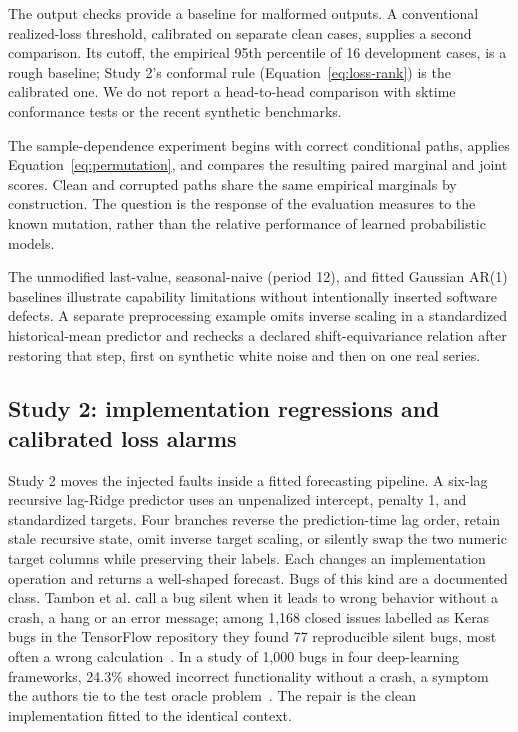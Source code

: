 \documentclass[11pt,a4paper]{article}
\begin{document}
The output checks provide a baseline for malformed outputs. A
conventional realized-loss threshold, calibrated on separate clean cases,
supplies a second comparison. Its cutoff, the empirical 95th percentile of
16 development cases, is a rough baseline; Study 2's conformal rule
(Equation~\eqref{eq:loss-rank}) is the calibrated one. We do not report a head-to-head comparison
with sktime conformance tests or the recent synthetic benchmarks.

The sample-dependence experiment begins with correct conditional paths,
applies Equation~\eqref{eq:permutation}, and compares the resulting
paired marginal and joint scores. Clean and corrupted paths share the
same empirical marginals by construction. The question is the response
of the evaluation measures to the known mutation, rather than the
relative performance of learned probabilistic models.

The unmodified last-value, seasonal-naive (period 12), and fitted Gaussian
AR(1) baselines illustrate capability limitations without intentionally
inserted software defects. A separate preprocessing example omits inverse
scaling in a standardized historical-mean predictor and rechecks a declared
shift-equivariance relation after restoring that step, first on synthetic
white noise and then on one real series.

\subsection{Study 2: implementation regressions and calibrated loss alarms}
\label{sec:implementation-study}

Study 2 moves the injected faults inside a fitted forecasting pipeline. A
six-lag recursive lag-Ridge predictor uses an unpenalized intercept, penalty 1, and standardized targets.
Four branches reverse the prediction-time lag order, retain stale
recursive state, omit inverse target scaling, or silently swap the two
numeric target columns while preserving their labels. Each changes an
implementation operation and returns a well-shaped forecast.
Bugs of this kind are a documented class. Tambon et al. call a bug silent
when it leads to wrong behavior without a crash, a hang or an error
message; among 1,168 closed issues labelled as Keras bugs in the
TensorFlow repository they found 77 reproducible silent bugs, most often a
wrong calculation~\cite{tambon2024silent}. In a study of 1,000 bugs in four
deep-learning frameworks, 24.3\% showed incorrect functionality without a
crash, a symptom the authors tie to the test oracle
problem~\cite{chen2023toward}. The repair
is the clean implementation fitted to the identical context.
\end{document}
